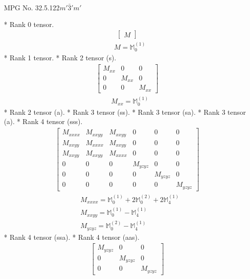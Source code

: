 \documentclass[fleqn,8pt,landscape]{jsarticle}
\begin{document}
\setcounter{MaxMatrixCols}{32}

\renewcommand{\tablename}{Table~}
\renewcommand{\figurename}{Figure~}
\begin{center}
\LARGE
MPG No. 32.5.122\quad$m'\bar{3}'m'$
\end{center}
* Rank 0 tensor.
\begin{align*}
\begin{bmatrix} M \end{bmatrix}
\end{align*}
\begin{align*}
& M = \mathbb{M}_{0}^{(1)}
\end{align*}
* Rank 1 tensor.
* Rank 2 tensor (s).
\begin{align*}
\begin{bmatrix} M_{xx} & 0 & 0 \\ 0 & M_{xx} & 0 \\ 0 & 0 & M_{xx} \end{bmatrix}
\end{align*}
\begin{align*}
& M_{xx} = \mathbb{M}_{0}^{(1)}
\end{align*}
* Rank 2 tensor (a).
* Rank 3 tensor (ss).
* Rank 3 tensor (sa).
* Rank 3 tensor (a).
* Rank 4 tensor (sss).
\begin{align*}
\begin{bmatrix} M_{xxxx} & M_{xxyy} & M_{xxyy} & 0 & 0 & 0 \\ M_{xxyy} & M_{xxxx} & M_{xxyy} & 0 & 0 & 0 \\ M_{xxyy} & M_{xxyy} & M_{xxxx} & 0 & 0 & 0 \\ 0 & 0 & 0 & M_{yzyz} & 0 & 0 \\ 0 & 0 & 0 & 0 & M_{yzyz} & 0 \\ 0 & 0 & 0 & 0 & 0 & M_{yzyz} \end{bmatrix}
\end{align*}
\begin{align*}
& M_{xxxx} = \mathbb{M}_{0}^{(1)} + 2 \mathbb{M}_{0}^{(2)} + 2 \mathbb{M}_{4}^{(1)} \\
& M_{xxyy} = \mathbb{M}_{0}^{(1)} - \mathbb{M}_{4}^{(1)} \\
& M_{yzyz} = \mathbb{M}_{0}^{(2)} - \mathbb{M}_{4}^{(1)}
\end{align*}
* Rank 4 tensor (ssa).
* Rank 4 tensor (aas).
\begin{align*}
\begin{bmatrix} M_{yzyz} & 0 & 0 \\ 0 & M_{yzyz} & 0 \\ 0 & 0 & M_{yzyz} \end{bmatrix}
\end{align*}
\end{document}
